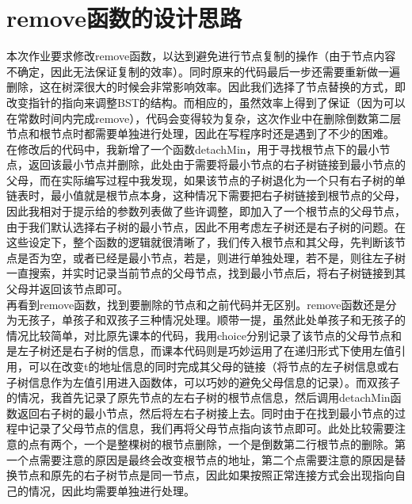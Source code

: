 \documentclass[UTF8]{ctexart}
\begin{document}
\pagestyle{fancy}
\fancyhead{}

\section{remove函数的设计思路}
\indent 本次作业要求修改remove函数，以达到避免进行节点复制的操作（由于节点内容不确定，因此无法保证复制的效率）。同时原来的代码最后一步还需要重新做一遍删除，这在树深很大的时候会非常影响效率。因此我们选择了节点替换的方式，即改变指针的指向来调整BST的结构。而相应的，虽然效率上得到了保证（因为可以在常数时间内完成remove），代码会变得较为复杂，这次作业中在删除倒数第二层节点和根节点时都需要单独进行处理，因此在写程序时还是遇到了不少的困难。\\
\indent 在修改后的代码中，我新增了一个函数detachMin，用于寻找根节点下的最小节点，返回该最小节点并删除，此处由于需要将最小节点的右子树链接到最小节点的父母，而在实际编写过程中我发现，如果该节点的子树退化为一个只有右子树的单链表时，最小值就是根节点本身，这种情况下需要把右子树链接到根节点的父母，因此我相对于提示给的参数列表做了些许调整，即加入了一个根节点的父母节点，由于我们默认选择右子树的最小节点，因此不用考虑左子树还是右子树的问题。在这些设定下，整个函数的逻辑就很清晰了，我们传入根节点和其父母，先判断该节点是否为空，或者已经是最小节点，若是，则进行单独处理，若不是，则往左子树一直搜索，并实时记录当前节点的父母节点，找到最小节点后，将右子树链接到其父母并返回该节点即可。\\
\indent 再看到remove函数，找到要删除的节点和之前代码并无区别。remove函数还是分为无孩子，单孩子和双孩子三种情况处理。顺带一提，虽然此处单孩子和无孩子的情况比较简单，对比原先课本的代码，我用choice分别记录了该节点的父母节点和是左子树还是右子树的信息，而课本代码则是巧妙运用了在递归形式下使用左值引用，可以在改变t的地址信息的同时完成其父母的链接（将节点的左子树信息或右子树信息作为左值引用进入函数体，可以巧妙的避免父母信息的记录）。而双孩子的情况，我首先记录了原先节点的左右子树的根节点信息，然后调用detachMin函数返回右子树的最小节点，然后将左右子树接上去。同时由于在找到最小节点的过程中记录了父母节点的信息，我们再将父母节点指向该节点即可。此处比较需要注意的点有两个，一个是整棵树的根节点删除，一个是倒数第二行根节点的删除。第一个点需要注意的原因是最终会改变根节点的地址，第二个点需要注意的原因是替换节点和原先的右子树节点是同一节点，因此如果按照正常连接方式会出现指向自己的情况，因此均需要单独进行处理。
\end{document}
